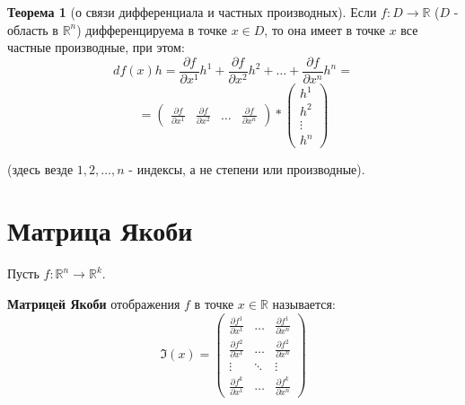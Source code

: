 \documentclass{report}
\theoremstyle{definition}
\newtheorem*{theorem}{Теорема}
\begin{document}
\begin{theorem}[о связи дифференциала и частных производных]
    Если $f:D\rightarrow\mathbb{R}$ ($D$ - область в $\mathbb{R}^n$) дифференцируема в точке $x \in D$, то она
    имеет в точке $x$ все частные производные, при этом:
    \begin{equation*}
        df(x)h = \frac{\partial f}{\partial x^1}h^1 + \frac{\partial f}{\partial x^2}h^2 + \ldots +
        \frac{\partial f}{\partial x^n}h^n =
    \end{equation*}
    \begin{equation*}
        =\left(\begin{array}{cccc}
            \frac{\partial f}{\partial x^1} & \frac{\partial f}{\partial x^2} & \ldots & \frac{\partial f}{\partial x^n}
        \end{array}\right) * \left(\begin{array}{c}
            h^1    \\
            h^2    \\
            \vdots \\
            h^n
        \end{array}\right)
    \end{equation*}

    (здесь везде $1,2,\ldots,n$ - индексы, а не степени или производные).
\end{theorem}

\section{Матрица Якоби}

Пусть $f:\mathbb{R}^n \rightarrow \mathbb{R}^k$.

\textbf{Матрицей Якоби} отображения $f$ в точке $x\in\mathbb{R}$ называется:
\begin{equation*}
    \mathfrak{I}(x) = \left(
    \begin{array}{ccc}
            \frac{\partial f^1}{\partial x^1} & \ldots & \frac{\partial f^1}{\partial x^n} \\
            \frac{\partial f^2}{\partial x^1} & \ldots & \frac{\partial f^2}{\partial x^n} \\
            \vdots                            & \ddots & \vdots                            \\
            \frac{\partial f^k}{\partial x^1} & \ldots & \frac{\partial f^k}{\partial x^n}
        \end{array}
    \right)
\end{equation*}
\end{document}
